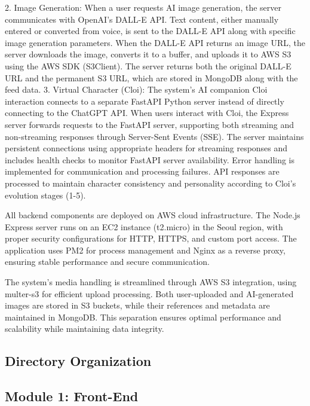 \documentclass[conference]{IEEEtran}
\begin{document}
            2. Image Generation: When a user requests AI image generation, the server communicates with OpenAI's DALL-E API. Text content, either manually entered or converted from voice, is sent to the DALL-E API along with specific image generation parameters. When the DALL-E API returns an image URL, the server downloads the image, converts it to a buffer, and uploads it to AWS S3 using the AWS SDK (S3Client). The server returns both the original DALL-E URL and the permanent S3 URL, which are stored in MongoDB along with the feed data.
            3. Virtual Character (Cloi): The system's AI companion Cloi interaction connects to a separate FastAPI Python server instead of directly connecting to the ChatGPT API. When users interact with Cloi, the Express server forwards requests to the FastAPI server, supporting both streaming and non-streaming responses through Server-Sent Events (SSE). The server maintains persistent connections using appropriate headers for streaming responses and includes health checks to monitor FastAPI server availability. Error handling is implemented for communication and processing failures. API responses are processed to maintain character consistency and personality according to Cloi's evolution stages (1-5).
            
            All backend components are deployed on AWS cloud infrastructure. The Node.js Express server runs on an EC2 instance (t2.micro) in the Seoul region, with proper security configurations for HTTP, HTTPS, and custom port access. The application uses PM2 for process management and Nginx as a reverse proxy, ensuring stable performance and secure communication.
            
            The system's media handling is streamlined through AWS S3 integration, using multer-s3 for efficient upload processing. Both user-uploaded and AI-generated images are stored in S3 buckets, while their references and metadata are maintained in MongoDB. This separation ensures optimal performance and scalability while maintaining data integrity.
            \vspace{3mm}
            
    \subsection{Directory Organization}
    \subsection{Module 1: Front-End}
\end{document}
